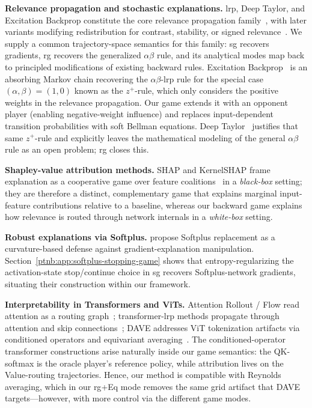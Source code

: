\textbf{Relevance propagation and stochastic explanations.} \ac{lrp}, Deep Taylor, and Excitation
Backprop constitute the core relevance propagation family~\parencite{Bach2015,Montavon2017DeepTaylor,Zhang2018pointinggame}, with later variants modifying redistribution for contrast, stability, or
signed relevance~\parencite{Binder2016LRN,Kohlbrenner2020,Gu2019CLRP,Nam2020,vukadin2024abslrp}. We supply
a common trajectory-space semantics for this family: \ac{sg} recovers gradients, \ac{rg} recovers
the generalized $\alpha\beta$ rule, and its analytical modes map back to principled modifications
of existing backward rules. Excitation Backprop~\parencite{Zhang2018pointinggame} is an absorbing Markov
chain recovering the $\alpha\beta$-\ac{lrp} rule for the special case $(\alpha, \beta) = (1,0)$
known as the $z^+$-rule, which only considers the positive weights in the relevance propagation.
Our game extends it with an opponent player (enabling negative-weight influence) and replaces
input-dependent transition probabilities with soft Bellman equations.
Deep
Taylor~\parencite{Montavon2017DeepTaylor} justifies that same $z^+$-rule and explicitly leaves the mathematical
modeling of the general $\alpha\beta$ rule as an open problem; \ac{rg} closes this.

\textbf{Shapley-value attribution methods.} SHAP and KernelSHAP frame explanation as a cooperative
game over feature coalitions~\parencite{LundbergLee2017_existing} in a \emph{black-box} setting; they are therefore
a distinct, complementary game that explains marginal input-feature contributions relative to a
baseline, whereas our backward game explains how relevance is routed through network internals in a
\emph{white-box} setting.

\textbf{Robust explanations via Softplus.} \textcite{Dombrowski2020} propose Softplus replacement as a
curvature-based defense against gradient-explanation manipulation.
Section~\ref{ptnb:app:softplus-stopping-game} shows that entropy-regularizing the activation-state
stop/continue choice in \ac{sg} recovers Softplus-network gradients, situating their construction
within our framework.

\textbf{Interpretability in Transformers and ViTs.} Attention Rollout / Flow read attention as a routing
graph~\parencite{Abnar2020attention}; transformer-\ac{lrp} methods propagate through attention and skip
connections~\parencite{Chefer2021GenericAttention,Ali2022AttnLRP,Achtibat2024AttnLRP}; DAVE addresses ViT
tokenization artifacts via conditioned operators and equivariant averaging~\parencite{Wrobel2024}. The
conditioned-operator transformer constructions arise naturally inside our game semantics: the
QK-softmax is the oracle player's reference policy, while attribution lives on the Value-routing
trajectories. Hence, our method is compatible with Reynolds averaging, which in our \ac{rg}+Eq mode
removes the same grid artifact that DAVE targets---however, with more control via the different
game modes.
